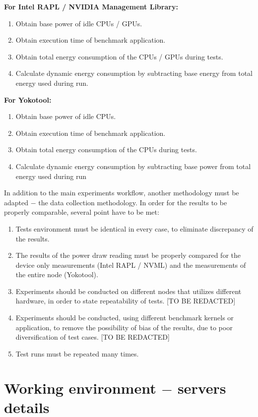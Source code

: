 \textbf{For Intel RAPL / NVIDIA Management Library:}
\begin{enumerate}
    \item Obtain base power of idle CPUs / GPUs.
    \item Obtain execution time of benchmark application.
    \item Obtain total energy consumption of the CPUs / GPUs during tests.
    \item Calculate dynamic energy consumption by subtracting base energy from
    total energy used during run.
\end{enumerate}

\textbf{For Yokotool:}
\begin{enumerate}
    \item Obtain base power of idle CPUs.
    \item Obtain execution time of benchmark application.
    \item Obtain total energy consumption of the CPUs during tests.
    \item Calculate dynamic energy consumption by subtracting base power from
    total energy used during run
\end{enumerate}

\newpage

In addition to the main experiments workflow, another methodology must be
adapted $-$ the data collection methodology. In order for the results to be
properly comparable, several point have to be met:
\begin{enumerate}
    \item Tests environment must be identical in every case, to eliminate
    discrepancy of the results.
    \item The results of the power draw reading must be properly compared for
    the device only measurements (Intel RAPL / NVML) and the measurements of
    the entire node (Yokotool).
    \item Experiments should be conducted on different nodes that utilizes
    different hardware, in order to state repeatability of tests. [TO BE REDACTED]
    \item Experiments should be conducted, using different benchmark kernels
    or application, to remove the possibility of bias of the results, due to
    poor diversification of test cases. [TO BE REDACTED]
    \item Test runs must be repeated many times.
\end{enumerate}

\section{Working environment $-$ servers details}

